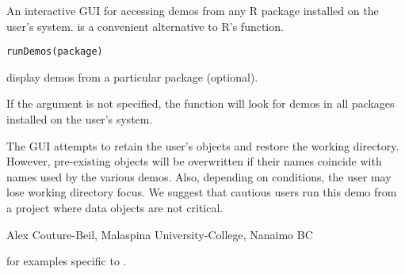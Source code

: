 \documentclass[letterpaper]{book}
\begin{document}
\begin{Description}\relax
An interactive GUI for accessing demos from any R package installed on the 
user's system.  is a convenient alternative to R's  
function.
\end{Description}
\begin{Usage}
\begin{verbatim}runDemos(package)\end{verbatim}
\end{Usage}
\begin{Arguments}
\begin{ldescription}
\item[\code{package}] display demos from a particular package (optional).
\end{ldescription}
\end{Arguments}
\begin{Details}\relax
If the argument  is not specified, the function will look for 
demos in all packages installed on the user's system.
\end{Details}
\begin{Note}\relax
The  GUI attempts to retain the user's objects and restore
the working directory. However, pre-existing objects will be overwritten 
if their names coincide with names used by the various demos. Also, 
depending on conditions, the user may lose working directory focus. 
We suggest that cautious users run this demo from a project where data objects are 
not critical.
\end{Note}
\begin{Author}\relax
Alex Couture-Beil, Malaspina University-College, Nanaimo BC
\end{Author}
\begin{SeeAlso}\relax
{}  for examples specific to .
\end{SeeAlso}
\end{document}
